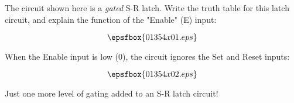 

The circuit shown here is a {\it gated} S-R latch.  Write the truth table for this latch circuit, and explain the function of the "Enable" (E) input:

$$\epsfbox{01354x01.eps}$$







When the Enable input is low (0), the circuit ignores the Set and Reset inputs:

$$\epsfbox{01354x02.eps}$$







Just one more level of gating added to an S-R latch circuit!



